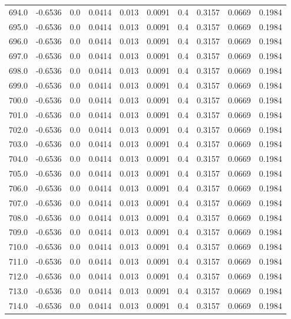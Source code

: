 \begin{longtable}{lrrrrrrrrr}
694.0 & -0.6536 & 0.0 & 0.0414 & 0.013 & 0.0091 & 0.4 & 0.3157 & 0.0669 & 0.1984 \\
695.0 & -0.6536 & 0.0 & 0.0414 & 0.013 & 0.0091 & 0.4 & 0.3157 & 0.0669 & 0.1984 \\
696.0 & -0.6536 & 0.0 & 0.0414 & 0.013 & 0.0091 & 0.4 & 0.3157 & 0.0669 & 0.1984 \\
697.0 & -0.6536 & 0.0 & 0.0414 & 0.013 & 0.0091 & 0.4 & 0.3157 & 0.0669 & 0.1984 \\
698.0 & -0.6536 & 0.0 & 0.0414 & 0.013 & 0.0091 & 0.4 & 0.3157 & 0.0669 & 0.1984 \\
699.0 & -0.6536 & 0.0 & 0.0414 & 0.013 & 0.0091 & 0.4 & 0.3157 & 0.0669 & 0.1984 \\
700.0 & -0.6536 & 0.0 & 0.0414 & 0.013 & 0.0091 & 0.4 & 0.3157 & 0.0669 & 0.1984 \\
701.0 & -0.6536 & 0.0 & 0.0414 & 0.013 & 0.0091 & 0.4 & 0.3157 & 0.0669 & 0.1984 \\
702.0 & -0.6536 & 0.0 & 0.0414 & 0.013 & 0.0091 & 0.4 & 0.3157 & 0.0669 & 0.1984 \\
703.0 & -0.6536 & 0.0 & 0.0414 & 0.013 & 0.0091 & 0.4 & 0.3157 & 0.0669 & 0.1984 \\
704.0 & -0.6536 & 0.0 & 0.0414 & 0.013 & 0.0091 & 0.4 & 0.3157 & 0.0669 & 0.1984 \\
705.0 & -0.6536 & 0.0 & 0.0414 & 0.013 & 0.0091 & 0.4 & 0.3157 & 0.0669 & 0.1984 \\
706.0 & -0.6536 & 0.0 & 0.0414 & 0.013 & 0.0091 & 0.4 & 0.3157 & 0.0669 & 0.1984 \\
707.0 & -0.6536 & 0.0 & 0.0414 & 0.013 & 0.0091 & 0.4 & 0.3157 & 0.0669 & 0.1984 \\
708.0 & -0.6536 & 0.0 & 0.0414 & 0.013 & 0.0091 & 0.4 & 0.3157 & 0.0669 & 0.1984 \\
709.0 & -0.6536 & 0.0 & 0.0414 & 0.013 & 0.0091 & 0.4 & 0.3157 & 0.0669 & 0.1984 \\
710.0 & -0.6536 & 0.0 & 0.0414 & 0.013 & 0.0091 & 0.4 & 0.3157 & 0.0669 & 0.1984 \\
711.0 & -0.6536 & 0.0 & 0.0414 & 0.013 & 0.0091 & 0.4 & 0.3157 & 0.0669 & 0.1984 \\
712.0 & -0.6536 & 0.0 & 0.0414 & 0.013 & 0.0091 & 0.4 & 0.3157 & 0.0669 & 0.1984 \\
713.0 & -0.6536 & 0.0 & 0.0414 & 0.013 & 0.0091 & 0.4 & 0.3157 & 0.0669 & 0.1984 \\
714.0 & -0.6536 & 0.0 & 0.0414 & 0.013 & 0.0091 & 0.4 & 0.3157 & 0.0669 & 0.1984 \\

\end{longtable}
